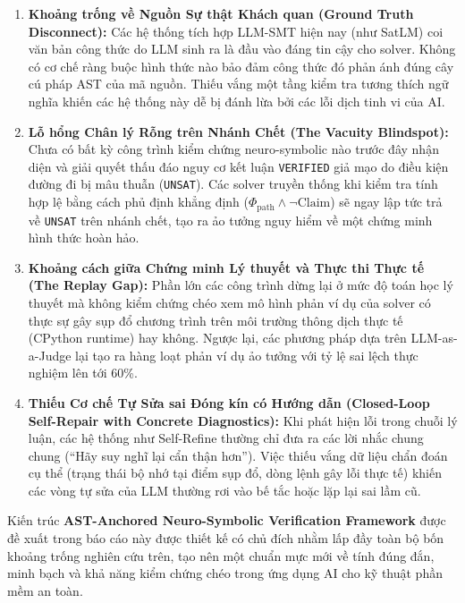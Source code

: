 \begin{enumerate}
    \item \textbf{Khoảng trống về Nguồn Sự thật Khách quan (Ground Truth Disconnect):} Các hệ thống tích hợp LLM-SMT hiện nay (như SatLM) coi văn bản công thức do LLM sinh ra là đầu vào đáng tin cậy cho solver. Không có cơ chế ràng buộc hình thức nào bảo đảm công thức đó phản ánh đúng cây cú pháp AST của mã nguồn. Thiếu vắng một tầng kiểm tra tương thích ngữ nghĩa khiến các hệ thống này dễ bị đánh lừa bởi các lỗi dịch tinh vi của AI.
    \item \textbf{Lỗ hổng Chân lý Rỗng trên Nhánh Chết (The Vacuity Blindspot):} Chưa có bất kỳ công trình kiểm chứng neuro-symbolic nào trước đây nhận diện và giải quyết thấu đáo nguy cơ kết luận \texttt{VERIFIED} giả mạo do điều kiện đường đi bị mâu thuẫn (\texttt{UNSAT}). Các solver truyền thống khi kiểm tra tính hợp lệ bằng cách phủ định khẳng định ($\Phi_{\text{path}} \land \neg \text{Claim}$) sẽ ngay lập tức trả về \texttt{UNSAT} trên nhánh chết, tạo ra ảo tưởng nguy hiểm về một chứng minh hình thức hoàn hảo.
    \item \textbf{Khoảng cách giữa Chứng minh Lý thuyết và Thực thi Thực tế (The Replay Gap):} Phần lớn các công trình dừng lại ở mức độ toán học lý thuyết mà không kiểm chứng chéo xem mô hình phản ví dụ của solver có thực sự gây sụp đổ chương trình trên môi trường thông dịch thực tế (CPython runtime) hay không. Ngược lại, các phương pháp dựa trên LLM-as-a-Judge lại tạo ra hàng loạt phản ví dụ ảo tưởng với tỷ lệ sai lệch thực nghiệm lên tới 60\%.
    \item \textbf{Thiếu Cơ chế Tự Sửa sai Đóng kín có Hướng dẫn (Closed-Loop Self-Repair with Concrete Diagnostics):} Khi phát hiện lỗi trong chuỗi lý luận, các hệ thống như Self-Refine thường chỉ đưa ra các lời nhắc chung chung (``Hãy suy nghĩ lại cẩn thận hơn''). Việc thiếu vắng dữ liệu chẩn đoán cụ thể (trạng thái bộ nhớ tại điểm sụp đổ, dòng lệnh gây lỗi thực tế) khiến các vòng tự sửa của LLM thường rơi vào bế tắc hoặc lặp lại sai lầm cũ.
\end{enumerate}

Kiến trúc \textbf{AST-Anchored Neuro-Symbolic Verification Framework} được đề xuất trong báo cáo này được thiết kế có chủ đích nhằm lấp đầy toàn bộ bốn khoảng trống nghiên cứu trên, tạo nên một chuẩn mực mới về tính đúng đắn, minh bạch và khả năng kiểm chứng chéo trong ứng dụng AI cho kỹ thuật phần mềm an toàn.
